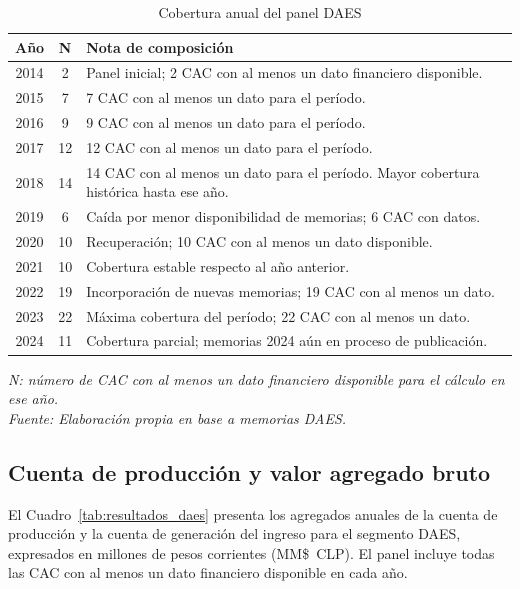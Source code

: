 \begin{table}[H]
\centering
\caption{Cobertura anual del panel DAES}
\label{tab:cobertura_daes}
\small
\renewcommand{\arraystretch}{1.3}
\begin{tabularx}{\textwidth}{@{} c c X @{}}
\toprule
\textbf{Año} & \textbf{N} & \textbf{Nota de composición} \\
\midrule
2014 &  2 & Panel inicial; 2 CAC con al menos un dato financiero disponible. \\
2015 &  7 & 7 CAC con al menos un dato para el período. \\
2016 &  9 & 9 CAC con al menos un dato para el período. \\
2017 & 12 & 12 CAC con al menos un dato para el período. \\
2018 & 14 & 14 CAC con al menos un dato para el período. Mayor cobertura histórica hasta ese año. \\
2019 &  6 & Caída por menor disponibilidad de memorias; 6 CAC con datos. \\
2020 & 10 & Recuperación; 10 CAC con al menos un dato disponible. \\
2021 & 10 & Cobertura estable respecto al año anterior. \\
2022 & 19 & Incorporación de nuevas memorias; 19 CAC con al menos un dato. \\
2023 & 22 & Máxima cobertura del período; 22 CAC con al menos un dato. \\
2024 & 11 & Cobertura parcial; memorias 2024 aún en proceso de publicación. \\
\bottomrule
\end{tabularx}
\vspace{4pt}
{\footnotesize \textit{N: número de CAC con al menos un dato financiero disponible para el cálculo en ese año.\\
Fuente: Elaboración propia en base a memorias DAES.}}
\end{table}

\subsection{Cuenta de producción y valor agregado bruto}
\label{subsec:produccion-daes}
El Cuadro~\ref{tab:resultados_daes} presenta los agregados
anuales de la cuenta de producción y la cuenta de generación
del ingreso para el segmento DAES, expresados en millones de
pesos corrientes (MM\$~CLP). El panel incluye todas las CAC
con al menos un dato financiero disponible en cada año.

